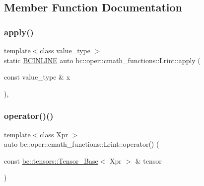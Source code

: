\subsection{Member Function Documentation}
\mbox{\label{structbc_1_1oper_1_1cmath__functions_1_1Lrint_acf7db4c07e221dd4a5d4de0b20b0d024}} 
\subsubsection{\texorpdfstring{apply()}{apply()}}
{\footnotesize\ttfamily template$<$class value\+\_\+type $>$ \\
static \hyperlink{common_8h_a6699e8b0449da5c0fafb878e59c1d4b1}{B\+C\+I\+N\+L\+I\+NE} auto bc\+::oper\+::cmath\+\_\+functions\+::\+Lrint\+::apply (\begin{DoxyParamCaption}\item[{const value\+\_\+type \&}]{x }\end{DoxyParamCaption})\hspace{0.3cm}{\ttfamily [inline]}, {\ttfamily [static]}}

\mbox{\label{structbc_1_1oper_1_1cmath__functions_1_1Lrint_aa4179a65cb6b7b8d926ec8e723de3b61}} 
\subsubsection{\texorpdfstring{operator()()}{operator()()}\hspace{0.1cm}{\footnotesize\ttfamily [1/3]}}
{\footnotesize\ttfamily template$<$class Xpr $>$ \\
auto bc\+::oper\+::cmath\+\_\+functions\+::\+Lrint\+::operator() (\begin{DoxyParamCaption}\item[{const \hyperlink{classbc_1_1tensors_1_1Tensor__Base}{bc\+::tensors\+::\+Tensor\+\_\+\+Base}$<$ Xpr $>$ \&}]{tensor }\end{DoxyParamCaption})\hspace{0.3cm}{\ttfamily [inline]}}

